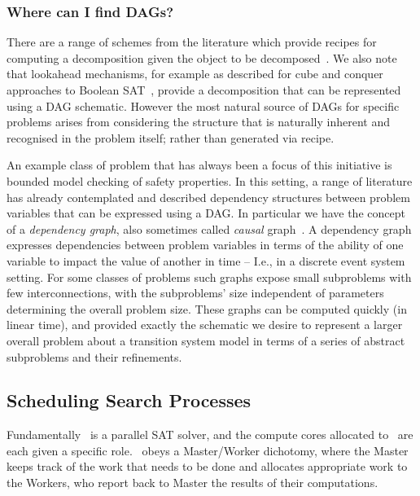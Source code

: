 \documentclass[
10pt, %
a4paper, %
oneside, %
headinclude,footinclude, %
BCOR5mm, %
]{scrartcl}
\begin{document}
\subsubsection{Where can I find DAGs?}


There are a range of schemes from the literature which provide recipes for computing a decomposition given the object to be decomposed~\cite{conf/ictai/HabetPT09,NEURIPS2019_6e62a992}.
We also note that lookahead mechanisms, for example as described for cube and conquer approaches to Boolean SAT~\cite{cube_and_conquer1}, provide a decomposition that can be represented using a DAG schematic. 
However the most natural source of DAGs for specific problems arises from considering the structure that is naturally inherent and recognised in the problem itself; rather than generated via recipe.

An example class of problem that has always been a focus of this initiative is bounded model checking of safety properties. 
In this setting, a range of literature has already contemplated and described dependency structures between problem variables that can be expressed using a DAG.
In particular we have the concept of a {\em dependency graph}, also sometimes called {\em causal} graph~\cite{Knoblock94,WilliamsN97}.
A dependency graph expresses dependencies between problem variables in terms of the ability of one variable to impact the value of another in time -- I.e., in a discrete event system setting.
For some classes of problems such graphs expose small subproblems with few interconnections, with the subproblems’ size independent of parameters determining the overall problem size.
These graphs can be computed quickly (in linear time), and provided exactly the schematic we desire to represent a larger overall problem about a transition system model in terms of a series of abstract subproblems and their refinements.


\subsection{Scheduling Search Processes}\label{sec:configuration}

Fundamentally \dagster\  is a parallel SAT solver, and the compute cores allocated to \dagster\  are each given a specific role.
\dagster\  obeys a Master/Worker dichotomy, where the Master keeps track of the work that needs to be done and allocates appropriate work to the Workers, who
report back to Master the results of their computations.
\end{document}
